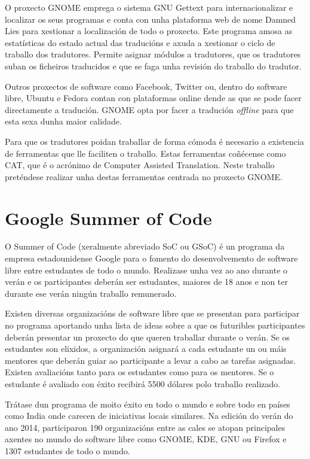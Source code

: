 O proxecto GNOME emprega o sistema GNU Gettext para internacionalizar e localizar os seus programas e conta con unha plataforma web de nome Damned Lies para xestionar a localización de todo o proxecto. Este programa amosa as estatísticas do estado actual das traducións e axuda a xestionar o ciclo de traballo dos tradutores. Permite asignar módulos a tradutores, que os tradutores suban os ficheiros traducidos e que se faga unha revisión do traballo do tradutor.

Outros proxectos de software como Facebook, Twitter ou, dentro do software libre, Ubuntu e Fedora contan con plataformas online dende as que se pode facer directamente a tradución. GNOME opta por facer a tradución \emph{offline} para que esta sexa dunha maior calidade.

Para que os tradutores poidan traballar de forma cómoda é necesario a existencia de ferramentas que lle faciliten o traballo. Estas ferramentas coñécense como CAT, que é o acrónimo de Computer Assisted Translation. Neste traballo preténdese realizar unha destas ferramentas centrada no proxecto GNOME.

\section{Google Summer of Code}
O Summer of Code (xeralmente abreviado SoC ou GSoC) é un programa da empresa estadounidense Google para o fomento do desenvolvemento de software libre entre estudantes de todo o mundo. Realizase unha vez ao ano durante o verán e os participantes deberán ser estudantes, maiores de 18 anos e non ter durante ese verán ningún traballo remunerado.

Existen diversas organizacións de software libre que se presentan para participar no programa aportando unha lista de ideas sobre a que os futuribles participantes deberán presentar un proxecto do que queren traballar durante o verán. Se os estudantes son elixidos, a organización asignará a cada estudante un ou máis mentores que deberán guiar ao participante a levar a cabo as tarefas asignadas. Existen avaliacións tanto para os estudantes como para os mentores. Se o estudante é avaliado con éxito recibirá 5500 dólares polo traballo realizado.

Trátase dun programa de moito éxito en todo o mundo e sobre todo en países como India onde carecen de iniciativas locais similares. Na edición do verán do ano 2014, participaron 190 organizacións entre as cales se atopan principales axentes no mundo do software libre como GNOME, KDE, GNU ou Firefox e 1307 estudantes de todo o mundo.

